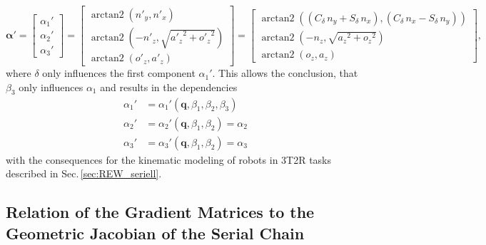 \documentclass[robotics,article,submit,moreauthors,pdftex]{Definitions/mdpi}
\newcommand{\bm}[1]{\boldsymbol{#1}}
\DeclareMathOperator{\arctantwo}{arctan2}
\begin{document}
\begin{equation}
\bm{\alpha}'
=
\begin{bmatrix}
\alpha_1' \\
\alpha_2' \\
\alpha_3'
\end{bmatrix}
=
\begin{bmatrix}
\arctantwo \left( {n'_y} , { n'_x} \right) \\ 
\arctantwo \left( -{n'_z} , \sqrt {{{a'_z}}^{2}+{{ o'_z}}^{2}} \right) \\ 
\arctantwo \left( {o'_z} , {a'_z} \right)
\end{bmatrix}
=
\begin{bmatrix}
\arctantwo \left( ({  C_{\delta}}\,{n_y}+{ S_{\delta}}\,{n_x}) , ({ C_{\delta}}\,{n_x}-{  S_{\delta}}\,{n_y}) \right) \\
\arctantwo \left( -{n_z} , \sqrt {{{a_z}}^{2}+{{ o_z}}^{2}} \right) \\
\arctantwo \left( {o_z} , {a_z} \right)
\end{bmatrix},
\end{equation}
%
where $\delta$  only influences the first component $\alpha_1'$.
This allows the conclusion, that $\beta_3$ only influences $\alpha_1$ and results in the dependencies
%
\begin{align}
    \alpha_1'&=\alpha_1'(\bm{q},\beta_1,\beta_2,\beta_3)\\
    \alpha_2'&=\alpha_2'(\bm{q},\beta_1,\beta_2) =\alpha_2\\
    \alpha_3'&=\alpha_3'(\bm{q},\beta_1,\beta_2) =\alpha_3
\end{align}
%
with the consequences for the kinematic modeling of robots in 3T2R tasks described in Sec.\,\ref{sec:REW_seriell}.

\subsection{Relation of the Gradient Matrices to the Geometric Jacobian of the Serial Chain}
\label{sec:appendix_gradient_geomjacobian}

\end{document}
